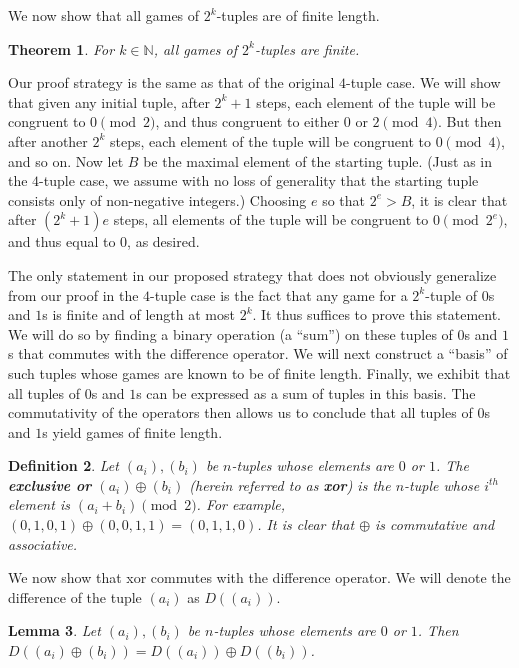 \documentclass[12pt]{amsart}
\newtheorem{theorem}{Theorem}[section]
\newtheorem{definition}[theorem]{Definition}
\newtheorem{lemma}[theorem]{Lemma}
\newcommand{\xor}{\oplus}
\newcommand{\znn}{\mathbb{N}}
\begin{document}
We now show that all games of $2^k$-tuples are of finite length.

\begin{theorem}
For $k\in \znn$, all games of $2^k$-tuples are finite.
\end{theorem}

Our proof strategy is the same as that of the original $4$-tuple case. We will show that given any initial tuple, after $2^k+1$ steps, each element of the tuple will be congruent to $0\pmod{2}$, and thus congruent to either $0$ or $2\pmod{4}$. But then after another $2^k$ steps, each element of the tuple will be congruent to $0\pmod{4}$, and so on. Now let $B$ be the maximal element of the starting tuple. (Just as in the $4$-tuple case, we assume with no loss of generality that the starting tuple consists only of non-negative integers.) Choosing $e$ so that $2^e>B$, it is clear that after $(2^k+1)e$ steps, all elements of the tuple will be congruent to $0\pmod{2^e}$, and thus equal to $0$, as desired.

The only statement in our proposed strategy that does not obviously generalize from our proof in the $4$-tuple case is the fact that any game for a $2^k$-tuple of $0$s and $1$s is finite and of length at most $2^k$. It thus suffices to prove this statement. We will do so by finding a binary operation (a ``sum'') on these tuples of $0$s and $1$s that commutes with the difference operator. We will next construct a ``basis'' of such tuples whose games are known to be of finite length. Finally, we exhibit that all tuples of $0$s and $1$s can be expressed as a sum of tuples in this basis. The commutativity of the operators then allows us to conclude that all tuples of $0$s and $1$s yield games of finite length.

\begin{definition}
Let $(a_i),(b_i)$ be $n$-tuples whose elements are $0$ or $1$. The \textbf{exclusive or} $(a_i)\xor (b_i)$ (herein referred to as \textbf{xor}) is the $n$-tuple whose $i^{th}$ element is $(a_i+b_i)\pmod{2}$. For example, $(0,1,0,1)\xor(0,0,1,1)=(0,1,1,0)$. It is clear that $\xor$ is commutative and associative.
\end{definition}

We now show that xor commutes with the difference operator. We will denote the difference of the tuple $(a_i)$ as $D((a_i))$.

\begin{lemma}
Let $(a_i),(b_i)$ be $n$-tuples whose elements are $0$ or $1$. Then $D((a_i)\xor (b_i))=D((a_i))\xor D((b_i))$.
\end{lemma}
\end{document}
